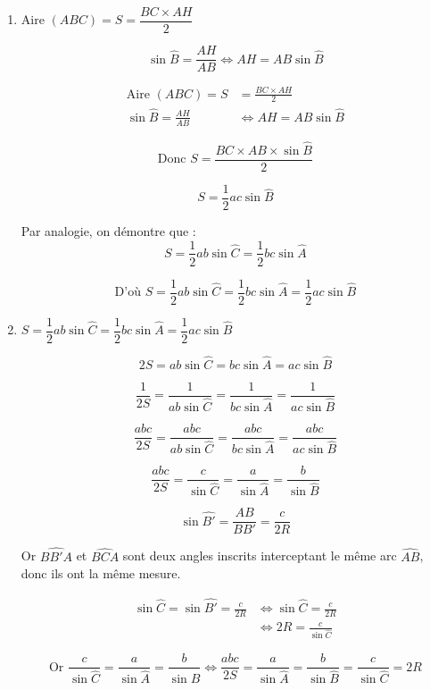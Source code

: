 \documentclass[12pt,a4paper]{article}
\begin{document}
\vspace{0.5cm}
\begin{enumerate}
\item
$
\text{Aire }(ABC) = S = \dfrac{BC \times AH}{2}
$

\[
\sin \widehat{B} = \frac{AH}{AB} \iff AH = AB \sin \widehat{B}
\]

\begin{align*}
\text{Aire }(ABC) = S &= \frac{BC \times AH}{2} \\
\sin \widehat{B} = \frac{AH}{AB} &\iff AH = AB \sin \widehat{B}
\end{align*}

\[
\text{Donc } S = \frac{BC \times AB \times \sin \widehat{B}}{2}
\]

\[
S = \frac{1}{2} ac \sin \widehat{B}
\]

Par analogie, on démontre que :
\[
S = \frac{1}{2} ab \sin \widehat{C} = \frac{1}{2} bc \sin \widehat{A}
\]

\[
\text{D'où } S = \frac{1}{2} ab \sin \widehat{C} = \frac{1}{2} bc \sin \widehat{A} = \frac{1}{2} ac \sin \widehat{B}
\]

    \item 
    $
    S = \dfrac{1}{2} ab \sin \widehat{C} = \dfrac{1}{2} bc \sin \widehat{A} = \dfrac{1}{2} ac \sin \widehat{B}
    $

    \[
    2S = ab \sin \widehat{C} = bc \sin \widehat{A} = ac \sin \widehat{B}
    \]

    \[
    \frac{1}{2S} = \frac{1}{ab \sin \widehat{C}} = \frac{1}{bc \sin \widehat{A}} = \frac{1}{ac \sin \widehat{B}}
    \]

    \[
    \frac{abc}{2S} = \frac{abc}{ab \sin \widehat{C}} = \frac{abc}{bc \sin \widehat{A}} = \frac{abc}{ac \sin \widehat{B}}
    \]

    \[
    \frac{abc}{2S} = \frac{c}{\sin \widehat{C}} = \frac{a}{\sin \widehat{A}} = \frac{b}{\sin \widehat{B}}
    \]

    \[
\sin \widehat{B'} = \frac{AB}{BB'} = \frac{c}{2R}
\]

Or $\widehat{BB'A}$ et $\widehat{BCA}$ sont deux angles inscrits interceptant le même arc $\widehat{AB}$, donc ils ont la même mesure.

\begin{align*}
\sin \widehat{C} = \sin \widehat{B'} = \frac{c}{2R} &\iff \sin \widehat{C} = \frac{c}{2R} \\
&\iff 2R = \frac{c}{\sin \widehat{C}}
\end{align*}

\[
\text{Or } \frac{c}{\sin \widehat{C}} = \frac{a}{\sin \widehat{A}} = \frac{b}{\sin \widehat{B}} \iff \frac{abc}{2S} = \frac{a}{\sin \widehat{A}} = \frac{b}{\sin \widehat{B}} = \frac{c}{\sin \widehat{C}} = 2R
\]
\end{enumerate}
\end{document}

